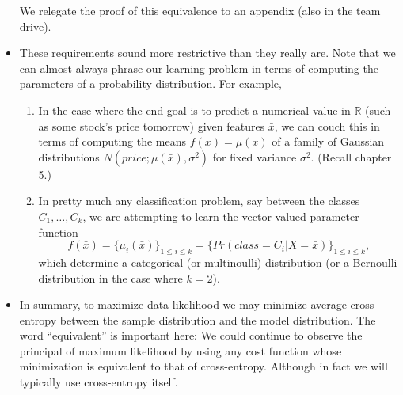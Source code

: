 \documentclass{article}
\begin{document}
\begin{itemize}
We relegate the proof of this equivalence to an appendix (also in the team drive).

\item  These requirements sound more restrictive than they really are.  Note that we can almost always phrase our learning problem in terms of computing the parameters of a probability distribution.  For example, 

\begin{enumerate}

\item In the case where the end goal is to predict a numerical value in $\mathbb{R}$ (such as some stock's price tomorrow) given features $\bar{x}$, we can couch this in terms of computing the means $f(\bar{x}) = \mu(\bar{x})$ of a family of Gaussian distributions $N(price; \mu(\bar{x}), \sigma^2)$ for fixed variance $\sigma^2$.  (Recall chapter 5.)

\item In pretty much any classification problem, say between the classes $C_{1}, \ldots, C_{k}$, we are attempting to learn the vector-valued parameter function 
$$f(\bar{x}) = \{\mu_{i}(\bar{x})\}_{1 \leq i \leq k} = \{Pr(class= C_{i} \vert X = \bar{x})\}_{1 \leq i \leq k},$$ which determine a categorical (or multinoulli) distribution (or a Bernoulli distribution in the case where $k = 2$).
\end{enumerate}

\item In summary, to maximize data likelihood we may minimize average cross-entropy between the sample distribution and the model distribution.  The word ``equivalent'' is important here:  We could continue to observe the principal of maximum likelihood by using any cost function whose minimization is equivalent to that of cross-entropy.  Although in fact we will typically use cross-entropy itself.
\end{itemize}
\end{document}
